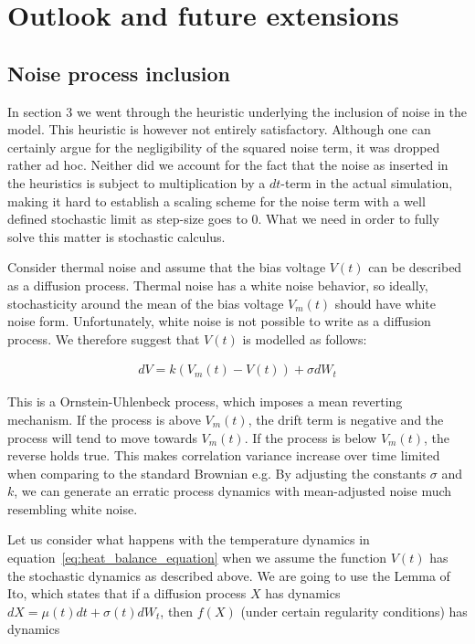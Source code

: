 \section{Outlook and future extensions}

\subsection{Noise process inclusion}
In section 3 we went through the heuristic underlying the inclusion of
noise in the model. This heuristic is however not entirely
satisfactory. Although one can certainly argue for the negligibility
of the squared noise term, it was dropped rather ad hoc. Neither did
we account for the fact that the noise as inserted in the heuristics
is subject to multiplication by a $dt$-term in the actual simulation,
making it hard to establish a scaling scheme for the noise term with a
well defined stochastic limit as step-size goes to 0. What we need in
order to fully solve this matter is stochastic calculus.


Consider thermal noise and assume that the bias voltage $V(t)$ can be
described as a diffusion process. Thermal noise has a white noise
behavior, so ideally, stochasticity around the mean of the bias
voltage $V_{m}(t)$ should have white noise form. Unfortunately, white
noise is not possible to write as a diffusion process. We therefore
suggest that $V(t)$ is modelled as follows:


\begin{align*}
d V = k(V_{m}(t)-V(t)) + \sigma dW_{t}
\end{align*}

This is a Ornstein-Uhlenbeck process, which imposes a mean reverting
mechanism. If the process is above $V_m(t)$, the drift term is
negative and the process will tend to move towards $V_m(t)$. If the
process is below $V_m(t)$, the reverse holds true. This makes
correlation variance increase over time limited when comparing to the
standard Brownian e.g. By adjusting the constants $\sigma$ and $k$, we
can generate an erratic process dynamics with mean-adjusted noise much
resembling white noise.


Let us consider what happens with the temperature dynamics in
equation~\eqref{eq:heat_balance_equation} when we assume the function
$V(t)$ has the stochastic dynamics as described above. We are going to
use the Lemma of Ito, which states that if a diffusion process $X$ has
dynamics $dX = \mu(t)dt + \sigma(t)dW_{t}$, then $f(X)$ (under certain
regularity conditions) has dynamics


